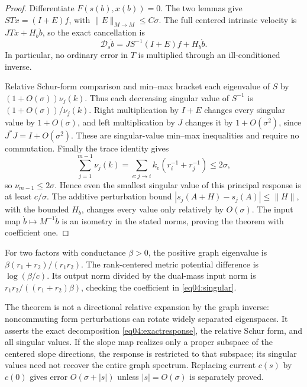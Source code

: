 \documentclass[11pt]{amsart}
\theoremstyle{definition}
\theoremstyle{remark}
\begin{document}
\begin{proof}
Differentiate \(F(s(b),x(b))=0\). The two lemmas give
\(ST\dot x=(I+E)f\), with \(\|E\|_{M\to M}\le C\sigma\).
The full centered intrinsic velocity is \(JT\dot x+H_b\dot b\),
so the exact cancellation is
\begin{equation}\label{eq04:exactresponse}
 \mathscr D_s\dot b=JS^{-1}(I+E)f+H_b\dot b.
\end{equation}
In particular, no ordinary error in \(T\) is multiplied through an
ill-conditioned inverse.

Relative Schur-form comparison and min--max bracket each eigenvalue
of \(S\) by \((1+O(\sigma))\nu_j(k)\). Thus each decreasing
singular value of \(S^{-1}\) is
\((1+O(\sigma))/\nu_j(k)\). Right multiplication by \(I+E\)
changes every singular value by \(1+O(\sigma)\), and left
multiplication by \(J\) changes it by \(1+O(\sigma^2)\), since
\(J^*J=I+O(\sigma^2)\). These are singular-value min--max
inequalities and require no commutation. Finally the trace identity gives
\[
 \sum_{j=1}^{m-1}\nu_j(k)
 =\sum_{e:j\to i}k_e(r_i^{-1}+r_j^{-1})\le2\sigma,
\]
so \(\nu_{m-1}\le2\sigma\). Hence even the smallest singular value
of this principal response is at least \(c/\sigma\).
The additive perturbation bound
\(|s_j(A+H)-s_j(A)|\le\|H\|\), with the bounded \(H_b\),
changes every value only relatively by \(O(\sigma)\).
The input map \(\dot b\mapsto M^{-1}\dot b\) is an isometry
in the stated norms, proving the theorem with coefficient one.
\end{proof}

For two factors with conductance \(\beta>0\), the positive graph
eigenvalue is \(\beta(r_1+r_2)/(r_1r_2)\). The rank-centered
metric potential difference is \(\log(\beta/c)\). Its output norm
divided by the dual-mass input norm is
\(r_1r_2/((r_1+r_2)\beta)\), checking the coefficient in
\eqref{eq04:singular}.

The theorem is not a directional relative expansion by the graph
inverse: noncommuting form perturbations can rotate widely separated
eigenspaces. It asserts the exact decomposition
\eqref{eq04:exactresponse}, the relative Schur form, and all singular
values. If the slope map realizes only a proper subspace of the
centered slope directions, the response is restricted to that
subspace; its singular values need not recover the entire
graph spectrum. Replacing current \(c(s)\) by \(c(0)\) gives error
\(O(\sigma+|s|)\) unless \(|s|=O(\sigma)\) is separately proved.

\end{document}
